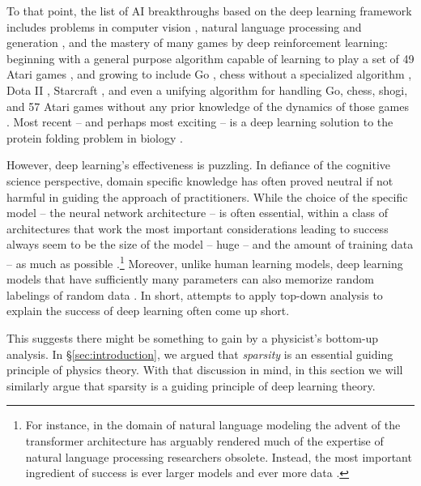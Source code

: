 \documentclass[12pt]{article}
\begin{document}
To that point, the list of AI breakthroughs based on the deep learning framework includes problems in computer vision \cite{ImageNet2012,goodfellow2014generative}, natural language processing and generation \cite{mikolov2013efficient,mikolov2013distributed,BERT2018,radford2019language,Brown2020LanguageMA}, and the mastery of many games by deep reinforcement learning: beginning with a general purpose algorithm capable of learning to play a set of 49 Atari games \cite{mnih2015human}, and growing to include Go \cite{silver2016mastering,silver2018general}, chess without a specialized algorithm \cite{silver2018general}, Dota II \cite{berner2019dota}, Starcraft \cite{starcraft}, and even a unifying algorithm for handling Go, chess, shogi, and 57 Atari games without any prior knowledge of the dynamics of those games \cite{muzero}. 
Most recent -- and perhaps most exciting  -- is a deep learning solution to the protein folding problem in biology \cite{alphafold2prelim}.

However, deep learning's effectiveness is puzzling.
In defiance of the cognitive science perspective, domain specific knowledge has often proved neutral if not harmful in guiding the approach of practitioners. While the choice of the specific model -- the neural network architecture -- 
is often essential, within a class of architectures that work the most important considerations leading to success always seem to be the size of the model -- huge -- and the amount of training data -- as much as possible \cite{sutton_2019}.\footnote{For instance, in the domain of natural language modeling the advent of the transformer architecture \cite{attention2017} has arguably rendered much of the expertise of natural language processing researchers obsolete. Instead, the most important ingredient of success is ever larger models and ever more data \cite{kaplan2020scaling}.
}
Moreover, unlike human learning models, deep learning models that have sufficiently many parameters can also memorize random labelings of random data \cite{zhang2016understanding}.
In short, attempts to apply top-down analysis to explain the success of deep learning often come up short. 




This suggests there might be something to gain by a physicist's bottom-up analysis. 
In \S\ref{sec:introduction}, we argued that \emph{sparsity} is an essential guiding principle of physics theory. With that discussion in mind, in this section we will similarly argue that sparsity is a guiding principle of deep learning theory.
\end{document}

